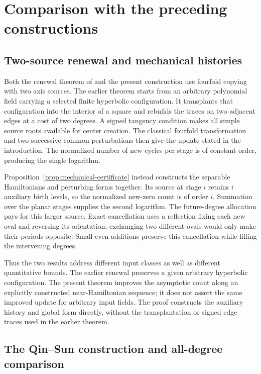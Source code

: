 \section{Comparison with the preceding constructions}\label{sec:replication}

\subsection{Two-source renewal and mechanical histories}\label{sec:scope}

Both the renewal theorem of \cite[Proposition~4.1]{Lu2026} and the
present construction use fourfold copying with two axis sources.
The earlier theorem starts from an
arbitrary polynomial field carrying a selected finite hyperbolic
configuration. It transplants that configuration into the interior of a
square and rebuilds the traces on two adjacent edges at a cost of two
degrees. A signed tangency condition makes all simple source roots
available for center creation. The classical fourfold transformation and
two successive common perturbations then give the update stated in the
introduction. The normalized number of new cycles per stage is of
constant order, producing the single logarithm.

Proposition~\ref{prop:mechanical-certificate} instead constructs the
separable Hamiltonians and perturbing forms together. Its source at
stage $i$ retains $i$ auxiliary birth levels, so the normalized new-zero
count is of order $i$. Summation over the planar stages supplies the
second logarithm. The future-degree allocation pays for this larger
source. Exact cancellation uses a reflection fixing each new oval and
reversing its orientation; exchanging two different ovals would only
make their periods opposite. Small even additions preserve this
cancellation while filling the intervening degrees.

Thus the two results address different input classes as well as
different quantitative bounds. The earlier renewal preserves a given
arbitrary hyperbolic configuration. The present theorem improves the
asymptotic count along an explicitly constructed near-Hamiltonian
sequence; it does not assert the same improved update for arbitrary
input fields. The proof constructs the auxiliary history and global
form directly, without the transplantation or signed edge traces used
in the earlier theorem.

\subsection{The Qin--Sun construction and all-degree comparison}

